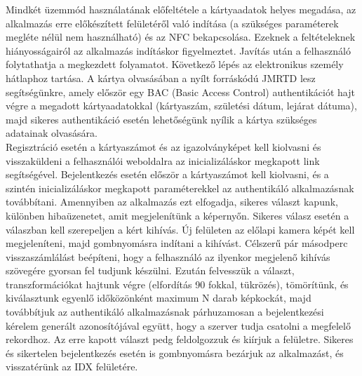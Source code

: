 Mindkét üzemmód használatának előfeltétele a kártyaadatok helyes megadása, az alkalmazás erre előkészített felületéről való indítása (a szükséges paraméterek megléte nélül nem használható) és az NFC bekapcsolása. Ezeknek a feltételeknek hiányosságairól az alkalmazás indításkor figyelmeztet. Javítás után a felhasználó folytathatja a megkezdett folyamatot. Következő lépés az elektronikus személy hátlaphoz tartása. A kártya olvasásában a nyílt forráskódú JMRTD lesz segítségünkre, amely először egy BAC (Basic Access Control) authentikációt hajt végre a megadott kártyaadatokkal (kártyaszám, születési dátum, lejárat dátuma), majd sikeres authentikáció esetén lehetőségünk nyílik a kártya szükséges adatainak olvasására.
\\Regisztráció esetén a kártyaszámot és az igazolványképet kell kiolvasni és visszaküldeni a felhasználói weboldalra az inicializáláskor megkapott link segítségével.
Bejelentkezés esetén először a kártyaszámot kell kiolvasni, és a szintén inicializáláskor megkapott paraméterekkel az authentikáló alkalmazásnak továbbítani. Amennyiben az alkalmazás ezt elfogadja, sikeres választ kapunk, különben hibaüzenetet, amit megjelenítünk a képernyőn. Sikeres válasz esetén a válaszban kell szerepeljen a kért kihívás. Új felületen az előlapi kamera képét kell megjeleníteni, majd gombnyomásra indítani a kihívást. Célszerű pár másodperc visszaszámlálást beépíteni, hogy a felhasználó az ilyenkor megjelenő kihívás szövegére gyorsan fel tudjunk készülni. Ezután felvesszük a választ, transzformációkat hajtunk végre (elfordítás 90 fokkal, tükrözés), tömörítünk, és kiválasztunk egyenlő időközönként maximum N darab képkockát, majd továbbítjuk az authentikáló alkalmazásnak párhuzamosan a bejelentkezési kérelem generált azonosítójával együtt, hogy a szerver tudja csatolni a megfelelő rekordhoz. Az erre kapott választ pedg feldolgozzuk és kiírjuk a felületre. Sikeres és sikertelen bejelentkezés esetén is gombnyomásra bezárjuk az alkalmazást, és visszatérünk az IDX felületére.

